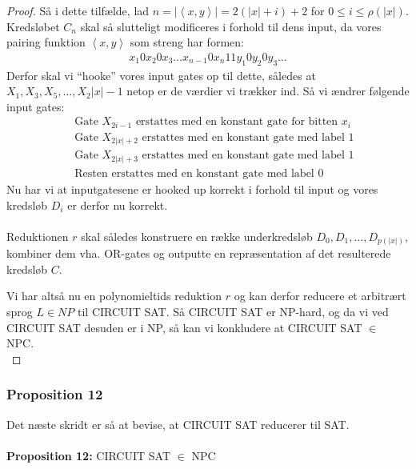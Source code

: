 \begin{proof}
Så i dette tilfælde, lad $n = |\left\langle x,y \right\rangle| = 2(|x| + i) + 2$ for $0 \leq i \leq \rho(|x|)$. Kredsløbet $C_n$ skal så slutteligt modificeres i forhold til dens input, da vores pairing funktion $\left\langle x,y \right\rangle$ som streng har formen:
\begin{align*}
 x_1 0 x_2 0 x_3 \hdots x_{n-1} 0 x_n 11 y_1 0 y_2 0 y_3 \hdots 
\end{align*}
Derfor skal vi ``hooke'' vores input gates op til dette, således at $X_1, X_3, X_5, \hdots, X_2|x|-1$ netop er de værdier vi trækker ind. Så vi ændrer følgende input gates:
\begin{align*}
 &\text{ Gate } X_{2i-1} \text{ erstattes med en konstant gate for bitten } x_i \\
 &\text{ Gate } X_{2|x|+2} \text{ erstattes med en konstant gate med label } 1 \\
 &\text{ Gate } X_{2|x|+3} \text{ erstattes med en konstant gate med label } 1 \\
 &\text{ Resten erstattes med en konstant gate med label } 0
\end{align*}
Nu har vi at inputgatesene er hooked up korrekt i forhold til input og vores kredsløb $D_i$ er derfor nu korrekt.\\
~\\
Reduktionen $r$ skal således konstruere en række underkredsløb $D_0, D_1, \hdots, D_{p(|x|)}$, kombiner dem vha. OR-gates og outputte en repræsentation af det resulterede kredsløb $C$.

Vi har altså nu en polynomieltids reduktion $r$ og kan derfor reducere et arbitrært sprog $L \in NP$ til CIRCUIT SAT. Så CIRCUIT SAT er NP-hard, og da vi ved CIRCUIT SAT desuden er i NP, så kan vi konkludere at CIRCUIT SAT $\in$ NPC.\\
\end{proof}

\subsubsection{Proposition 12}

Det næste skridt er så at bevise, at CIRCUIT SAT reducerer til SAT.\\
~\\
\textbf{Proposition 12:} CIRCUIT SAT $\in$ NPC

